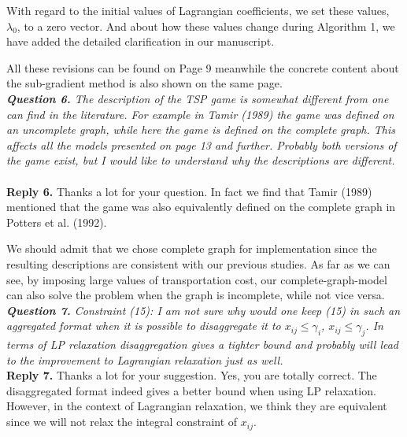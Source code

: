 \documentclass[11pt]{article}
\begin{document}
With regard to the initial values of Lagrangian coefficients, we set these values, $\lambda_0$, to a zero vector. And about how these values change during Algorithm 1, we have added the detailed clarification in our manuscript.

All these revisions can be found on Page 9 meanwhile the concrete content about the sub-gradient method is also shown on the same page.
\\[4mm]
%
%
\noindent \textit{\textbf{Question 6.}
The description of the TSP game is somewhat different from one can find in the literature. For example in Tamir (1989) the game was defined on an uncomplete graph, while here the game is defined on the complete graph. This affects all the models presented on page 13 and further. Probably both versions of the game exist, but I would like to understand why the descriptions are different.}
~\\[2mm]
\noindent \textbf{Reply 6.}
Thanks a lot for your question.
In fact we find that Tamir (1989) mentioned that the game was also equivalently defined on the complete graph in Potters et al. (1992).

We should admit that we chose complete graph for implementation since the resulting descriptions are consistent with our previous studies.
As far as we can see, by imposing large values of transportation cost, our complete-graph-model can also solve the problem when the graph is incomplete, while not vice versa.
\\[4mm]
\noindent \textit{\textbf{Question 7.}
Constraint (15): I am not sure why would one keep (15) in such an aggregated format when it is possible to disaggregate it to $x_{ij} \leq \gamma_i$, $x_{ij} \leq \gamma_j$. In terms of LP relaxation disaggregation gives a tighter bound and probably will lead to the improvement to Lagrangian relaxation just as well.}
\\[2mm]
\noindent \textbf{Reply 7.}
Thanks a lot for your suggestion.
Yes, you are totally correct. The disaggregated format indeed gives a better bound when using LP relaxation.
However, in the context of Lagrangian relaxation, we think they are equivalent since we will not relax the integral constraint of $x_{ij}$.
\end{document}
